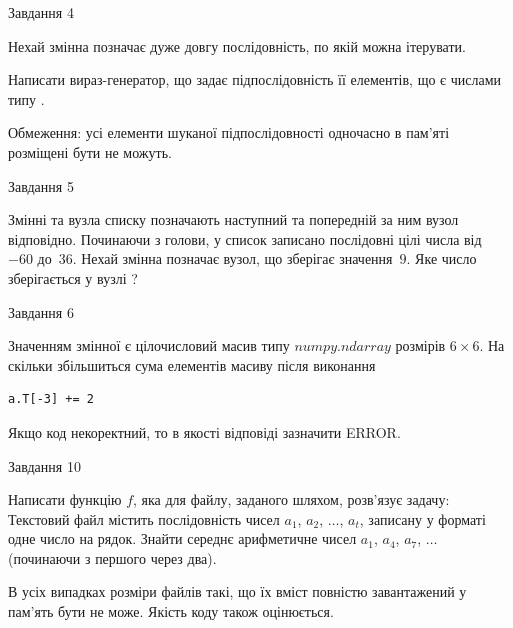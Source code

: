 \documentclass[12pt, ukrainian]{article}
\begin{document}
{               
{\begin{center}Завдання {4}\end{center}}
\vspace{-6mm}
Нехай змінна  позначає дуже довгу послідовність, по якій можна ітерувати.

Написати вираз-генератор, що задає підпослідовність її елементів, що є числами типу .

Обмеження: усі елементи шуканої підпослідовності одночасно в пам'яті розміщені бути не можуть.\par

\vspace{10mm}
               
{\begin{center}Завдання {5}\end{center}}
\vspace{-6mm}
Змінні  та  вузла списку позначають наступний та попередній за ним вузол відповідно. Починаючи з голови, у список записано послідовні цілі числа від~$-60$ до~$36$. Нехай змінна  позначає вузол, що зберігає значення~$9$.
Яке число зберігається у вузлі  ?\par

               
{\begin{center}Завдання {6}\end{center}}
\vspace{-6mm}
Значенням змінної  є цілочисловий масив типу $numpy.ndarray$ розмірів $6{\times}6$. На скільки збільшиться сума елементів масиву  після виконання
\begin{verbatim}
a.T[-3] += 2
\end{verbatim}


Якщо код некоректний, то в якості відповіді зазначити ERROR.\par

               
{\begin{center}Завдання {10}\end{center}}
\vspace{-6mm}

Написати функцію $f$, яка для файлу, заданого шляхом, розв’язує задачу:\\ Текстовий файл містить послідовність чисел $a_1$, $a_2$, $\ldots$, $a_t$, записану у форматі одне число на рядок. Знайти середнє арифметичне чисел $a_1$, $a_4$, $a_7$, $\ldots$ (починаючи з першого через два).

В усіх випадках розміри файлів такі, що їх вміст повністю завантажений у пам'ять бути не може. Якість коду також оцінюється.



}
\end{document}
